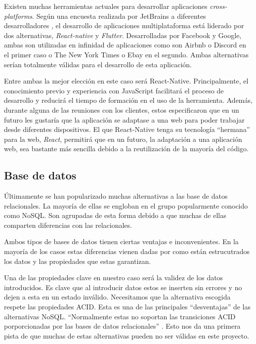 Existen muchas herramientas actuales para desarrollar aplicaciones \textit{cross-platforms}. Según una encuesta realizada por JetBrains a diferentes desarrolladores \cite{jetbrains-survey}, el desarrollo de aplicaciones multiplataforma está liderado por dos alternativas, \textit{React-native} y \textit{Flutter}. Desarrolladas por Facebook y Google, ambas son utilizadas en infinidad de aplicaciones como son Airbnb o Discord en el primer caso o The New York Times o Ebay en el segundo. Ambas alternativas serían totalmente válidas para el desarrollo de esta aplicación.

Entre ambas la mejor elección en este caso será React-Native. Principalmente, el conocimiento previo y experiencia con JavaScript facilitará el proceso de desarrollo y reducirá el tiempo de formación en el uso de la herramienta. Además, durante alguna de las reuniones con los clientes, estos especificaron que en un futuro les gustaría que la aplicación se adaptase a una web para poder trabajar desde diferentes dispositivos. El que React-Native tenga su tecnología ``hermana'' para la web, \textit{React}, permitirá que en un futuro, la adaptación a una aplicación web, sea bastante más sencilla debido a la reutilización de la mayoría del código. 

\subsection{Base de datos}

Últimamente se han popularizado muchas alternativas a las base de datos relacionales. La mayoría de ellas se engloban en el grupo popularmente conocido como NoSQL. Son agrupadas de esta forma debido a que muchas de ellas comparten diferencias con las relacionales. 

Ambos tipos de bases de datos tienen ciertas ventajas e inconvenientes. En la mayoría de los casos estas diferencias vienen dadas por como están estrucutrados los datos y las propiedades que estas garantizan.

Una de las propiedades clave en nuestro caso será la validez de los datos introducidos. Es clave que al introducir datos estos se inserten sin errores y no dejen a esta en un estado inválido. Necesitamos que la alternativa escogida respete las propiedades ACID. Esta es una de las principales ``desventajas'' de las alternativas NoSQL.  ``Normalmente estas no soportan las transiciones ACID porporcionadas por las bases de datos relacionales'' \cite{NoSQLvsSQL_1}. Esto nos da una primera pista de que muchas de estas alternativas pueden no ser válidas en este proyecto.


